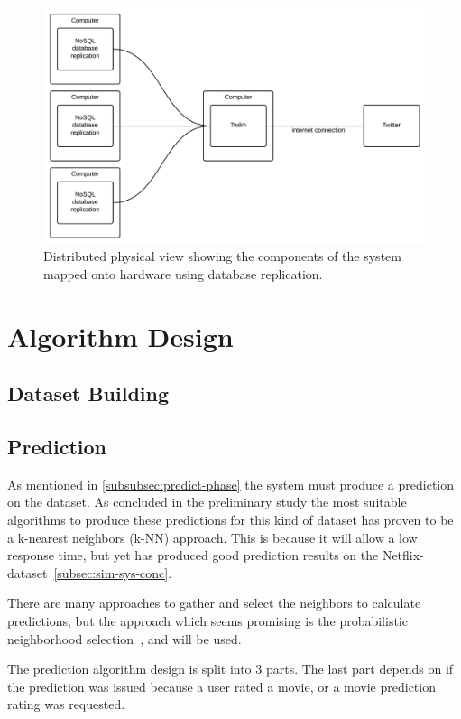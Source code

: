 \begin{figure}[H]
\centerline{\includegraphics[width=4.5in]{image/architecture-physical-view-distributed.png}}
\caption{Distributed physical view showing the components of the system mapped onto hardware using database replication.}
\label{figure:development-view}
\end{figure}

\section{Algorithm Design}
\subsection{Dataset Building}

\subsection{Prediction}
As mentioned in \ref{subsubsec:predict-phase} the system must produce a prediction on the dataset. As concluded in the preliminary study the most suitable algorithms to produce these predictions for this kind of dataset has proven to be a k-nearest neighbors (k-NN) approach. This is because it will allow a low response time, but yet has produced good prediction results on the Netflix-dataset~\ref{subsec:sim-sys-conc}.

There are many approaches to gather and select the neighbors to calculate predictions, but the approach which seems promising is the probabilistic neighborhood selection~\cite{probcobfilter}, and will be used.

The prediction algorithm design is split into 3 parts. The last part depends on if the prediction was issued because a user rated a movie, or a movie prediction rating was requested.

